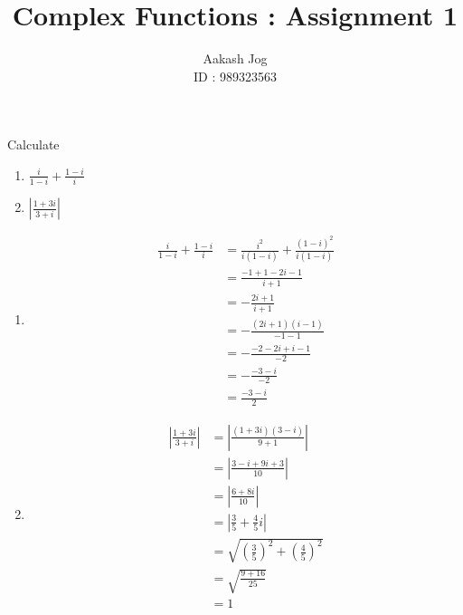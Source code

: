 \documentclass[fleqn, a4paper, 11pt, oneside]{amsart}
\title{Complex Functions : Assignment 1}
\author
{
	Aakash Jog\\
	ID : 989323563
}
\date{\formatdate{28}{10}{2015}}
\theoremstyle{definition}
\theoremstyle{theorem}
\begin{document}

\maketitle

\setcounter{question}{0}
\begin{question}
	Calculate
	\begin{enumerate}
		\item $\frac{i}{1 - i} + \frac{1 - i}{i}$
		\item $\left| \frac{1 + 3 i}{3 + i} \right|$
	\end{enumerate}
\end{question}

\begin{solution}
	\begin{enumerate}[leftmargin=*]
		\item
			\begin{align*}
				\frac{i}{1 - i} + \frac{1 - i}{i} &= \frac{i^2}{i (1 - i)} + \frac{(1 - i)^2}{i (1 - i)}\\
				&= \frac{-1 + 1 - 2 i - 1}{i + 1}\\
				&= -\frac{2 i + 1}{i + 1}\\
				&= -\frac{(2 i + 1) (i - 1)}{-1 - 1}\\
				&= -\frac{-2 - 2 i + i - 1}{-2}\\
				&= -\frac{-3 - i}{-2}\\
				&= \frac{-3 - i}{2}
			\end{align*}
		\item
			\begin{align*}
				\left| \frac{1 + 3 i}{3 + i} \right| &= \left| \frac{(1 + 3 i) (3 - i)}{9 + 1} \right|\\
				&= \left| \frac{3 - i + 9 i + 3}{10} \right|\\
				&= \left| \frac{6 + 8 i}{10} \right|\\
				&= \left| \frac{3}{5} + \frac{4}{5} i \right|\\
				&= \sqrt{\left( \frac{3}{5} \right)^2 + \left( \frac{4}{5} \right)^2}\\
				&= \sqrt{\frac{9 + 16}{25}}\\
				&= 1
			\end{align*}
	\end{enumerate}
\end{solution}
\end{document}
